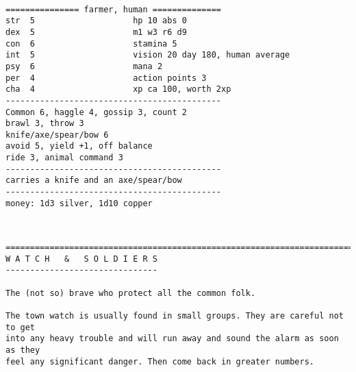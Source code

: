 \

\goodbreak \begin{samepage} \small \begin{verbatim}
=============== farmer, human ==============
str  5                    hp 10 abs 0
dex  5                    m1 w3 r6 d9
con  6                    stamina 5
int  5                    vision 20 day 180, human average
psy  6                    mana 2
per  4                    action points 3
cha  4                    xp ca 100, worth 2xp
--------------------------------------------
Common 6, haggle 4, gossip 3, count 2
brawl 3, throw 3
knife/axe/spear/bow 6
avoid 5, yield +1, off balance
ride 3, animal command 3
--------------------------------------------
carries a knife and an axe/spear/bow
--------------------------------------------
money: 1d3 silver, 1d10 copper
\end{verbatim} \normalsize \end{samepage}

\








\goodbreak
{}


\goodbreak \begin{samepage} \small \begin{verbatim}
================================================================================
W A T C H   &   S O L D I E R S
-------------------------------

The (not so) brave who protect all the common folk.

The town watch is usually found in small groups. They are careful not to get
into any heavy trouble and will run away and sound the alarm as soon as they
feel any significant danger. Then come back in greater numbers.
\end{verbatim} \normalsize \end{samepage}

\


